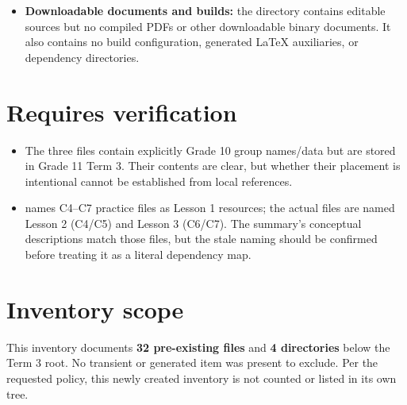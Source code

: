 \begin{itemize}
  any local CSV. The  files nevertheless match its
  requested two-sample numerical/proportion work: score and time data support
  mean comparisons, while binary success data support a proportion comparison.
  The two  files provide smaller demonstration layouts. The three
   files are additional two-group numeric datasets.
\item \textbf{Downloadable documents and builds:} the directory contains editable 
  sources but no compiled PDFs or other downloadable binary documents. It also
  contains no build configuration, generated LaTeX auxiliaries, or dependency
  directories.
\end{itemize}

\section{Requires verification}
\begin{verificationbox}

\begin{itemize}
\item The three  files contain explicitly Grade 10 group
  names/data but are stored in Grade 11 Term 3. Their contents are clear, but
  whether their placement is intentional cannot be established from local
  references.
\item {} names C4–C7 practice files as Lesson 1 resources; the
  actual files are named Lesson 2 (C4/C5) and Lesson 3 (C6/C7). The summary's
  conceptual descriptions match those files, but the stale naming should be
  confirmed before treating it as a literal dependency map.
\end{itemize}

\end{verificationbox}
\section{Inventory scope}

This inventory documents \textbf{32 pre-existing files} and \textbf{4 directories} below
the Term 3 root. No transient or generated item was present to exclude. Per the
requested policy, this newly created inventory is not counted or listed in its
own tree.


